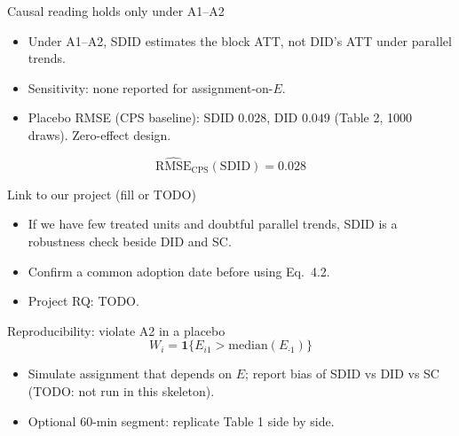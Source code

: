 \documentclass[aspectratio=169,10pt]{beamer}
\begin{document}
\begin{frame}{Causal reading holds only under A1--A2}
  \begin{itemize}
    \item Under A1--A2, SDID estimates the block ATT, not DID's ATT
      under parallel trends.
    \item Sensitivity: none reported for assignment-on-\(E\).
    \item Placebo RMSE (CPS baseline): SDID \(0.028\), DID \(0.049\)
      (Table 2, 1000 draws). Zero-effect design.
  \end{itemize}
  \begin{equation*}
    \widehat{\mathrm{RMSE}}_{\mathrm{CPS}}(\mathrm{SDID}) = 0.028
  \end{equation*}
\end{frame}

\begin{frame}{Link to our project (fill or TODO)}
  \begin{itemize}
    \item If we have few treated units and doubtful parallel trends,
      SDID is a robustness check beside DID and SC.
    \item Confirm a common adoption date before using Eq.~4.2.
    \item Project RQ: TODO.
  \end{itemize}
\end{frame}

\begin{frame}{Reproducibility: violate A2 in a placebo}
  \begin{equation*}
    W_i = \mathbf{1}\{E_{i1}>\mathrm{median}(E_{\cdot 1})\}
  \end{equation*}
  \begin{itemize}
    \item Simulate assignment that depends on \(E\); report bias of SDID
      vs DID vs SC (TODO: not run in this skeleton).
    \item Optional 60-min segment: replicate Table 1 side by side.
  \end{itemize}
\end{frame}
\end{document}
